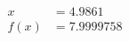 \documentclass[preview]{standalone}
\begin{document}
\begin{align*}
x &= 4.9861\\f(x) &= 7.9999758
\end{align*}
\end{document}
